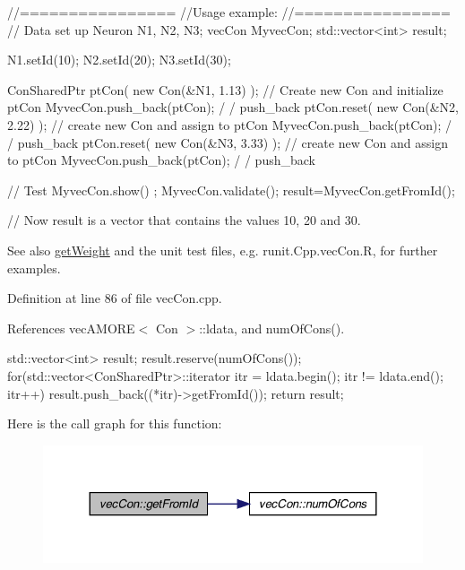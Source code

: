 \begin{DoxyCode}
  //================
  //Usage example:
  //================
        // Data set up
                        Neuron N1, N2, N3;
                        vecCon MyvecCon;
                        std::vector<int> result;

                        N1.setId(10);
                        N2.setId(20);
                        N3.setId(30);

                        ConSharedPtr ptCon( new Con(&N1, 1.13) );       // Create
       new Con and initialize ptCon
                        MyvecCon.push_back(ptCon);                              /
      / push_back
                        ptCon.reset(  new Con(&N2, 2.22) );             // create
       new Con and assign to ptCon
                        MyvecCon.push_back(ptCon);                              /
      / push_back
                        ptCon.reset(  new Con(&N3, 3.33) );             // create
       new Con and assign to ptCon
                        MyvecCon.push_back(ptCon);                              /
      / push_back

        // Test
                        MyvecCon.show() ;
                        MyvecCon.validate();
                        result=MyvecCon.getFromId();

        // Now result is a vector that contains the values 10, 20 and 30.
\end{DoxyCode}


\begin{DoxySeeAlso}{See also}
\hyperlink{classvec_con_a76f10669494f2247d036ae6a1f296873}{getWeight} and the unit test files, e.g. runit.Cpp.vecCon.R, for further examples. 
\end{DoxySeeAlso}


Definition at line 86 of file vecCon.cpp.



References vecAMORE$<$ Con $>$::ldata, and numOfCons().


\begin{DoxyCode}
                                  {
        std::vector<int> result;
        result.reserve(numOfCons());
        for(std::vector<ConSharedPtr>::iterator itr = ldata.begin();   itr != 
      ldata.end();   itr++)   { result.push_back((*itr)->getFromId()); }
        return result;
}
\end{DoxyCode}


Here is the call graph for this function:\nopagebreak
\begin{figure}[H]
\begin{center}
\leavevmode
\includegraphics[width=324pt]{classvec_con_aa9f3f5df4c4060951c975c4c829b8471_cgraph}
\end{center}
\end{figure}


